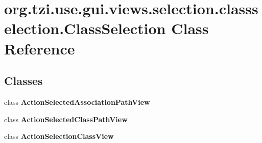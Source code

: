 \hypertarget{classorg_1_1tzi_1_1use_1_1gui_1_1views_1_1selection_1_1classselection_1_1_class_selection}{\section{org.\-tzi.\-use.\-gui.\-views.\-selection.\-classselection.\-Class\-Selection Class Reference}
\label{classorg_1_1tzi_1_1use_1_1gui_1_1views_1_1selection_1_1classselection_1_1_class_selection}
}
\subsection*{Classes}
\begin{DoxyCompactItemize}
\item 
class {\bfseries Action\-Selected\-Association\-Path\-View}
\item 
class {\bfseries Action\-Selected\-Class\-Path\-View}
\item 
class {\bfseries Action\-Selection\-Class\-View}
\end{DoxyCompactItemize}
